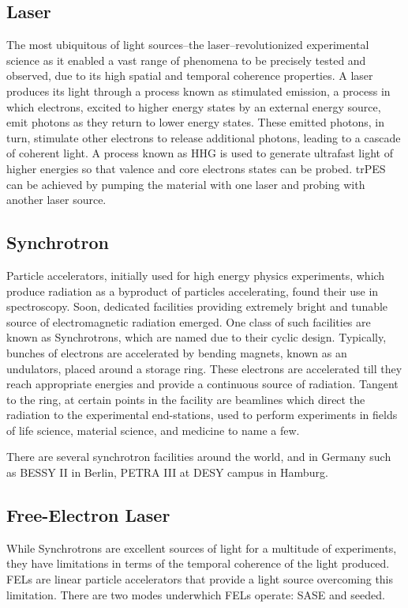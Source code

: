 \subsection{Laser}
The most ubiquitous of light sources--the laser--revolutionized experimental science as it enabled a vast range of phenomena to be precisely tested and observed, due to its high spatial and temporal coherence properties. A laser produces its light through a process known as stimulated emission, a process in which electrons, excited to higher energy states by an external energy source, emit photons as they return to lower energy states. These emitted photons, in turn, stimulate other electrons to release additional photons, leading to a cascade of coherent light. A process known as \gls{HHG} is used to generate ultrafast light of higher energies so that valence and core electrons states can be probed. \Gls{trPES} can be achieved by pumping the material with one laser and probing with another laser source.

\subsection{Synchrotron}
Particle accelerators, initially used for high energy physics experiments, which produce radiation as a byproduct of particles accelerating, found their use in spectroscopy. Soon, dedicated facilities providing extremely bright and tunable source of electromagnetic radiation emerged. One class of such facilities are known as Synchrotrons, which are named due to their cyclic design. Typically, bunches of electrons are accelerated by bending magnets, known as an \glspl{undulator}, placed around a storage ring. These electrons are accelerated till they reach appropriate energies and provide a continuous source of radiation. Tangent to the ring, at certain points in the facility are beamlines which direct the radiation to the experimental end-stations, used to perform experiments in fields of life science, material science, and medicine to name a few.

There are several synchrotron facilities around the world, and in Germany such as BESSY II in Berlin, PETRA III at DESY campus in Hamburg.

\subsection{Free-Electron Laser}
While Synchrotrons are excellent sources of light for a multitude of experiments, they have limitations in terms of the temporal coherence of the light produced. \Glspl{FEL} are linear particle accelerators that provide a light source overcoming this limitation. There are two modes underwhich \glspl{FEL} operate: \gls{SASE} and seeded.


